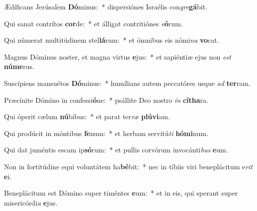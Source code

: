 \item Ædíficans Jerúsalem \textbf{Dó}minus:~* dispersiónes Israélis con\textit{gre}\textbf{gá}bit.
\item Qui sanat contrítos \textbf{cor}de:~* et álligat contritiónes \textit{e}\textbf{ó}rum.
\item Qui númerat multitúdinem stel\textbf{lá}rum:~* et ómnibus eis nómi\textit{na} \textbf{vo}cat.
\item Magnus Dóminus noster, et magna virtus \textbf{e}jus:~* et sapiéntiæ ejus non \textit{est} \textbf{nú}\textbf{me}rus.
\item Suscípiens mansuétos \textbf{Dó}minus:~* humílians autem peccatóres usque \textit{ad} \textbf{ter}ram.
\item Præcínite Dómino in confessi\textbf{ó}ne:~* psállite Deo nostro \textit{in} \textbf{cí}\textbf{tha}ra.
\item Qui óperit cælum \textbf{nú}bibus:~* et parat ter\textit{ræ} \textbf{plú}\textbf{vi}am.
\item Qui prodúcit in móntibus \textbf{fe}num:~* et herbam servitú\textit{ti} \textbf{hó}\textbf{mi}num.
\item Qui dat juméntis escam ip\textbf{só}rum:~* et pullis corvórum invocánti\textit{bus} \textbf{e}um.
\item Non in fortitúdine equi voluntátem ha\textbf{bé}bit:~* nec in tíbiis viri beneplácitum e\textit{rit} \textbf{e}i.
\item Beneplácitum est Dómino super timéntes \textbf{e}um:~* et in eis, qui sperant super misericórdi\textit{a} \textbf{e}jus.
